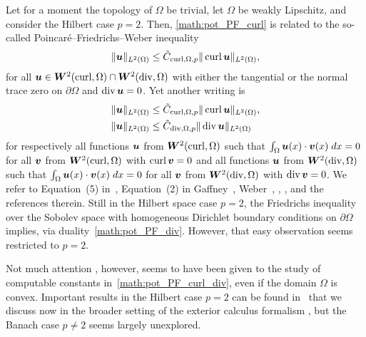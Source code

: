 \documentclass[10pt,a4paper]{article}
\newcommand\cye[1]{%
\protect\leavevmode
\begingroup
    \color{blue}%
    #1%
\endgroup
}
\begin{document}
\cye{Let for a moment the topology of $\Omega$ be trivial, let $\Omega$ be weakly Lipschitz, and consider the Hilbert case $p=2$. Then, \eqref{math:pot_PF_curl} is related to the so-called Poincar\'e--Friedrichs--Weber inequality
\begin{align}
    \label{math:Weber}
    \| \bm{u}\|_{L^{2}(\Omega)} \leq \tilde C_{\operatorname{curl},\Omega,p} \| \operatorname{curl} \bm{u} \|_{L^{2}(\Omega)},
\end{align}
for all $\bm{u} \in \bm{W}^{2}(\operatorname{curl},\Omega) \cap \bm{W}^{2}(\operatorname{div},\Omega)$ with either the tangential or the normal trace zero on $\partial \Omega$ and $\operatorname{div} \bm{u} = 0$. 
Yet another writing is 
\label{math:PF_orth} \begin{align}
    \| \bm{u}\|_{L^{2}(\Omega)} & \leq \tilde C_{\operatorname{curl},\Omega,p} \| \operatorname{curl} \bm{u} \|_{L^{2}(\Omega)}, \label{math:PF_orth_curl}\\
    \| \bm{u}\|_{L^{2}(\Omega)} & \leq \tilde C_{\operatorname{div},\Omega,p} \| \operatorname{div} \bm{u} \|_{L^{2}(\Omega)} \label{math:PF_orth_div}
\end{align}
for respectively all functions $\bm{u}$ from $\bm{W}^{2}(\operatorname{curl},\Omega)$ such that $\int_{\Omega} \bm{u}(x) \cdot \bm{v}(x) \;dx = 0$ for all $\bm{v}$ from $\bm{W}^{2}(\operatorname{curl},\Omega)$ with $\operatorname{curl} \bm{v} = 0$ and all functions $\bm{u}$ from $\bm{W}^{2}(\operatorname{div},\Omega)$ such that $\int_{\Omega} \bm{u}(x) \cdot \bm{v}(x) \;dx = 0$ for all $\bm{v}$ from $\bm{W}^{2}(\operatorname{div},\Omega)$ with $\operatorname{div} \bm{v} = 0$. We refer to Equation~(5) in~\cite{Fried_diff_forms_55}, Equation~(2) in Gaffney~\cite{Gaff_Hilbert_harm_55}, Weber~\cite{Web_compact_Maxw_80}, \cite[Lemmas~3.4 and~3.6]{Gir_Rav_NS_86}, \cite[Proposition~7.4]{Fer_Gil_Maxw_BC_97}, and the references therein. Still} in the Hilbert space case $p=2$, the Friedrichs inequality~\cite{burenkov1998sobolev} over the Sobolev space with \cye{homogeneous} Dirichlet boundary conditions \cye{on $\partial \Omega$} implies, via duality~\eqref{math:pot_PF_div}. However, that easy observation seems restricted to $p=2$. 

Not much attention\cye{, however,} seems to have been given to the study of \cye{computable} constants in~\eqref{math:pot_PF_curl_div}, even if the domain $\Omega$ is convex. \cye{Important results in the Hilbert case $p=2$ can be found in~\cite{guerini2004eigenvalue, Paul_Vald_PF_grad_curl_div_20} that we discuss now in the broader setting of} the exterior calculus formalism\cye{, but the Banach case $p \neq 2$ seems largely unexplored.}
\end{document}
